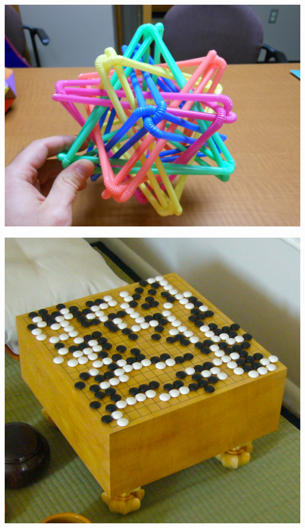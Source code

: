 \documentclass[xcolor={usenames,dvipsnames,svgnames,table},12pt]{beamer}
\begin{document}
\begin{frame}{}
  \begin{center}
    \includegraphics[width=\textwidth]{straws-thingy.jpg}
  \end{center}
\end{frame}

\begin{frame}{}
  \begin{center}
    \includegraphics[width=\textwidth]{FloorGoban.jpg}
  \end{center}
\end{frame}
\end{document}
